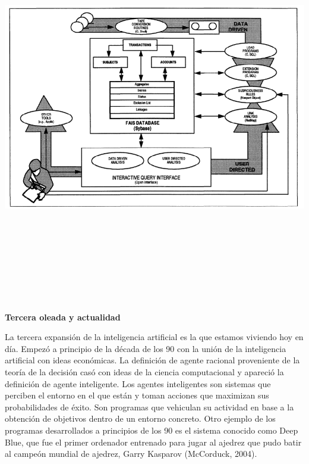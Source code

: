 \documentclass[]{DissertateUSU}
\begin{document}
\includegraphics[width=5.98958in,height=6.77083in]{FAIS.png}

\centering

\setlength\parskip{5ex}
\justifying

\textbf{Tercera oleada y actualidad}

\noindent La tercera expansión de la inteligencia artificial es la que
estamos viviendo hoy en día. Empezó a principio de la década de los 90
con la unión de la inteligencia artificial con ideas económicas. La
definición de agente racional proveniente de la teoría de la decisión
casó con ideas de la ciencia computacional y apareció la definición de
agente inteligente. Los agentes inteligentes son sistemas que perciben
el entorno en el que están y toman acciones que maximizan sus
probabilidades de éxito. Son programas que vehiculan su actividad en
base a la obtención de objetivos dentro de un entorno concreto. Otro
ejemplo de los programas desarrollados a principios de los 90 es el
sistema conocido como Deep Blue, que fue el primer ordenador entrenado
para jugar al ajedrez que pudo batir al campeón mundial de ajedrez,
Garry Kasparov (McCorduck, 2004).
\end{document}
